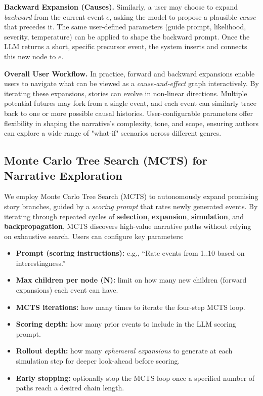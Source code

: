 \documentclass[11pt]{article}
\begin{document}
\textbf{Backward Expansion (Causes).}
Similarly, a user may choose to expand \emph{backward} from the current event \( e \), asking the model to propose a plausible \emph{cause} that precedes it. The same user-defined parameters (guide prompt, likelihood, severity, temperature) can be applied to shape the backward prompt. Once the LLM returns a short, specific precursor event, the system inserts and connects this new node to \( e \).

\textbf{Overall User Workflow.}
In practice, forward and backward expansions enable users to navigate what can be viewed as a \emph{cause‐and‐effect} graph interactively. By iterating these expansions, stories can evolve in non-linear directions. Multiple potential futures may fork from a single event, and each event can similarly trace back to one or more possible causal histories. User-configurable parameters offer flexibility in shaping the narrative's complexity, tone, and scope, ensuring authors can explore a wide range of "what-if" scenarios across different genres.

\subsection{Monte Carlo Tree Search (MCTS) for Narrative Exploration}
\label{subsec:mcts}

We employ Monte Carlo Tree Search (MCTS) \citep{abramson-mcts-thesis,chaslot-mcts,silver2016mastering} to autonomously expand promising story branches, guided by a \emph{scoring prompt} that rates newly generated events. By iterating through repeated cycles of \textbf{selection}, \textbf{expansion}, \textbf{simulation}, and \textbf{backpropagation}, MCTS discovers high-value narrative paths without relying on exhaustive search. Users can configure key parameters:
\begin{itemize}
 \item \textbf{Prompt (scoring instructions):} e.g., ``Rate events from 1..10 based on interestingness.''
 \item \textbf{Max children per node (N):} limit on how many new children (forward expansions) each event can have.
 \item \textbf{MCTS iterations:} how many times to iterate the four-step MCTS loop.
 \item \textbf{Scoring depth:} how many prior events to include in the LLM scoring prompt.
 \item \textbf{Rollout depth:} how many \emph{ephemeral expansions} to generate at each simulation step for deeper look-ahead before scoring.
 \item \textbf{Early stopping:} optionally stop the MCTS loop once a specified number of paths reach a desired chain length.
\end{itemize}
\end{document}

